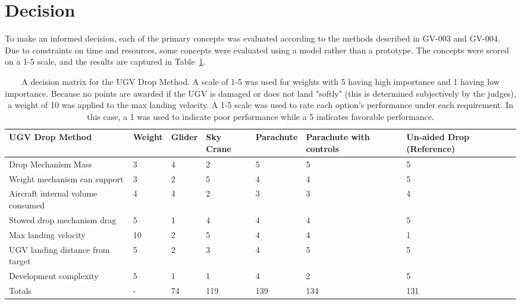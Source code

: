\documentclass[]{auvsi_doc}
\begin{document}
\section{Decision}
To make an informed decision, each of the primary concepts was evaluated according to the methods described in GV-003 and GV-004. 
Due to constraints on time and resources, some concepts were evaluated using a model rather than a prototype. 
The concepts were scored on a 1-5 scale, and the results are captured in Table~\ref{cont_cs_tab}.


\begin{table} [H]
\caption{A decision matrix for the UGV Drop Method. A scale of 1-5 was used for weights with 5 having high importance and 1 having low importance. Because no points are awarded if the UGV is damaged or does not land "softly" (this is determined subjectively by the judges), a weight of 10 was applied to the max landing velocity. A 1-5 scale was used to rate each option’s performance under each requirement. In this case, a 1 was used to indicate poor performance while a 5 indicates favorable performance.}
\label{cont_cs_tab}
	\begin{tabular}{|>{\raggedright}p{2.5cm}| l | l | l | l | p{2.5cm} | p{2.5cm} |}
\hline

UGV Drop Method&Weight&Glider&Sky Crane& Parachute& Parachute with controls& Un-aided Drop (Reference) \\
\hline
Drop Mechanism Mass&                                3&4&2&5&5&5 \\
\hline
Weight mechanism can support&                       3&2&5&4&4&5 \\
\hline
Aircraft internal volume consumed&                  4&4&2&3&3&4 \\
\hline
Stowed drop mechanism drag&                         5&1&4&4&4&5 \\
\hline
Max landing velocity&                               10&2&5&4&4&1 \\
\hline
UGV landing distance from target&                   5&2&3&4&5&5 \\
\hline
Development complexity&                             5&1&1&4&2&5 \\
\hline
Totals&                                             -&74&119&139&134&131 \\
\hline
\end{tabular}
\end{table}
\end{document}
